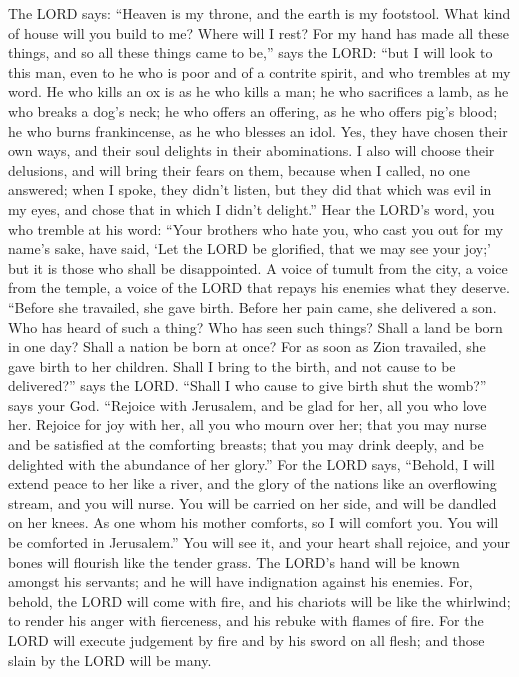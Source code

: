  The LORD says: ``Heaven is my throne, and the earth is my
footstool. What kind of house will you build to me? Where will I rest?
 For my hand has made all these things, and so all these
things came to be,'' says the LORD: ``but I will look to this man, even
to he who is poor and of a contrite spirit, and who trembles at my word.
 He who kills an ox is as he who kills a man; he who
sacrifices a lamb, as he who breaks a dog's neck; he who offers an
offering, as he who offers pig's blood; he who burns frankincense, as he
who blesses an idol. Yes, they have chosen their own ways, and their
soul delights in their abominations.  I also will choose
their delusions, and will bring their fears on them, because when I
called, no one answered; when I spoke, they didn't listen, but they did
that which was evil in my eyes, and chose that in which I didn't
delight.''  Hear the LORD's word, you who tremble at his
word: ``Your brothers who hate you, who cast you out for my name's sake,
have said, `Let the LORD be glorified, that we may see your joy;' but it
is those who shall be disappointed.  A voice of tumult from
the city, a voice from the temple, a voice of the LORD that repays his
enemies what they deserve.  ``Before she travailed, she gave
birth. Before her pain came, she delivered a son.  Who has
heard of such a thing? Who has seen such things? Shall a land be born in
one day? Shall a nation be born at once? For as soon as Zion travailed,
she gave birth to her children.  Shall I bring to the birth,
and not cause to be delivered?'' says the LORD. ``Shall I who cause to
give birth shut the womb?'' says your God.  ``Rejoice with
Jerusalem, and be glad for her, all you who love her. Rejoice for joy
with her, all you who mourn over her;  that you may nurse
and be satisfied at the comforting breasts; that you may drink deeply,
and be delighted with the abundance of her glory.''  For
the LORD says, ``Behold, I will extend peace to her like a river, and
the glory of the nations like an overflowing stream, and you will nurse.
You will be carried on her side, and will be dandled on her knees.
 As one whom his mother comforts, so I will comfort you.
You will be comforted in Jerusalem.''  You will see it, and
your heart shall rejoice, and your bones will flourish like the tender
grass. The LORD's hand will be known amongst his servants; and he will
have indignation against his enemies.  For, behold, the
LORD will come with fire, and his chariots will be like the whirlwind;
to render his anger with fierceness, and his rebuke with flames of fire.
 For the LORD will execute judgement by fire and by his
sword on all flesh; and those slain by the LORD will be many.

